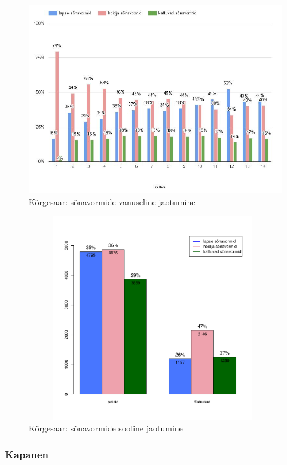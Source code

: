 \documentclass[12pt]{article}
\begin{document}
\begin{figure}[H]
    \centering
    \includegraphics[width=\textwidth]{korgesaar_vanus_vormid_crop}
    \caption{Kõrgesaar: sõnavormide vanuseline jaotumine}
\end{figure}


\begin{figure}[H]
    \centering
    \includegraphics[width=11cm, height=9cm]{korgesaar_sugu}
    \caption{Kõrgesaar: sõnavormide sooline jaotumine}
\end{figure}




\subsubsection{Kapanen}
\end{document}
